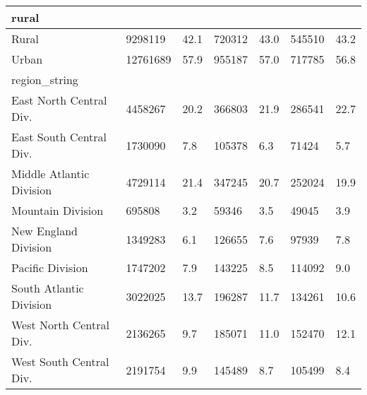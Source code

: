 \begin{longtable}{lllllll}
\midrule
\multicolumn{1}{l}{rural} \\ 
\midrule
Rural & 9298119 & 42.1 & 720312 & 43.0 & 545510 & 43.2 \\ 
Urban & 12761689 & 57.9 & 955187 & 57.0 & 717785 & 56.8 \\ 
\midrule
\multicolumn{1}{l}{region\_string} \\ 
\midrule
East North Central Div. & 4458267 & 20.2 & 366803 & 21.9 & 286541 & 22.7 \\ 
East South Central Div. & 1730090 & 7.8 & 105378 & 6.3 & 71424 & 5.7 \\ 
Middle Atlantic Division & 4729114 & 21.4 & 347245 & 20.7 & 252024 & 19.9 \\ 
Mountain Division & 695808 & 3.2 & 59346 & 3.5 & 49045 & 3.9 \\ 
New England Division & 1349283 & 6.1 & 126655 & 7.6 & 97939 & 7.8 \\ 
Pacific Division & 1747202 & 7.9 & 143225 & 8.5 & 114092 & 9.0 \\ 
South Atlantic Division & 3022025 & 13.7 & 196287 & 11.7 & 134261 & 10.6 \\ 
West North Central Div. & 2136265 & 9.7 & 185071 & 11.0 & 152470 & 12.1 \\ 
West South Central Div. & 2191754 & 9.9 & 145489 & 8.7 & 105499 & 8.4 \\ 
\bottomrule
\end{longtable}

